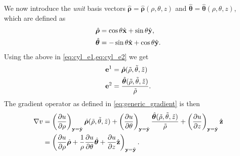 \documentclass[11pt]{article}
\newcommand{\ztilde}{\tilde{z}}
\newcommand{\rhotilde}{\tilde{\rho}}
\newcommand{\thetatilde}{\tilde{\theta}}
\newcommand{\boldrhohat}{\hat{\boldsymbol{\rho}}}
\newcommand{\boldthetahat}{\hat{\boldsymbol{\theta}}}
\begin{document}
We now introduce the \textit{unit} basis vectors $\boldrhohat = \boldrhohat(\rho, \theta, z)$ and $\boldthetahat = \boldthetahat(\rho, \theta, z)$, which are defined as
\begin{align}
    \boldrhohat &= \cos \theta \hat{\xvec} + \sin \theta \hat{\yvec}, \label{eq:cyl_rhohat} \\
    \boldthetahat &= - \sin \theta \hat{\xvec } + \cos \theta \hat{\yvec}. \label{eq:cyl_thetahat}
\end{align}
Using the above in \cref{eq:cyl_e1,eq:cyl_e2} we get
\begin{align}
    \evec^1 &= \boldrhohat(\rhotilde, \thetatilde, \ztilde) \\
    \evec^2 &= \frac{\boldthetahat(\rhotilde, \thetatilde, \ztilde)}{\rhotilde}.
\end{align}
The gradient operator as defined in \cref{eq:generic_gradient} is then
\begin{align}
    \nabla v &= \left ( \frac{\partial u }{\partial \rho} \right )_{\yvec = \tilde{\yvec}} \boldrhohat(\rhotilde, \thetatilde, \ztilde) + \left ( \frac{\partial u }{\partial \theta} \right )_{\yvec = \tilde{\yvec}} \frac{\boldthetahat(\rhotilde, \thetatilde, \ztilde)}{\rhotilde} + \left ( \frac{\partial u }{\partial z} \right )_{\yvec = \tilde{\yvec}} \hat{\zvec} \\
    &= \left( \frac{\partial u }{\partial \rho} \boldrhohat + \frac{1}{\rho} \frac{\partial u }{\partial \theta} \boldthetahat + \frac{\partial u }{\partial z} \hat{\zvec} \right)_{\yvec = \tilde{\yvec}}.
\end{align}
\end{document}
